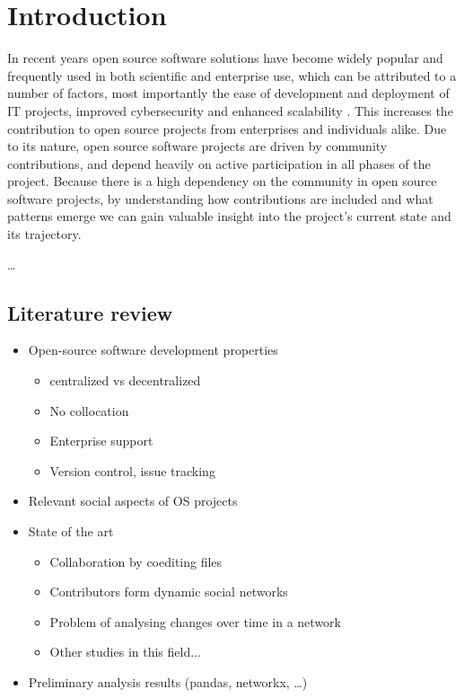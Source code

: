 \thepage
\section{Introduction}
In recent years open source software solutions have become widely popular and frequently used in both scientific and enterprise use, which can be attributed to a number of factors, most importantly the ease of development and deployment of IT projects, improved cybersecurity and enhanced scalability \cite{pwcLeadingBenefitsOpensource2016}. This increases the contribution to open source projects from enterprises and individuals alike. Due to its nature, open source software projects are driven by community contributions, and depend heavily on active participation in all phases of the project. Because there is a high dependency on the community in open source software projects, by understanding how contributions are included and what patterns emerge we can gain valuable insight into the project's current state and its trajectory.

\dots

\subsection{Literature review}
\begin{itemize}
    \item Open-source software development properties
    \begin{itemize}
        \item centralized vs decentralized
        \item No collocation
        \item Enterprise support
        \item Version control, issue tracking
    \end{itemize}
    \item Relevant social aspects of OS projects
    \item State of the art
    \begin{itemize}
        \item Collaboration by coediting files
        \item Contributors form dynamic social networks
        \item Problem of analysing changes over time in a network
        \item Other studies in this field...
    \end{itemize}
    \item Preliminary analysis results (pandas, networkx, \dots)
\end{itemize}


